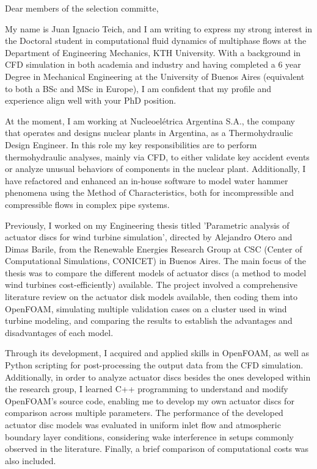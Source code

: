 \documentclass{letter}
\newcommand{\thesisname}{Parametric analysis of actuator discs for wind turbine simulation\xspace}
\newcommand{\phdtitle}{Doctoral student in computational fluid dynamics of multiphase flows\xspace}
\newcommand{\phddivision}{Department of Engineering Mechanics, KTH University\xspace}
\begin{document}
\begin{letter}{}
\opening{Dear members of the selection committe,}

My name is Juan Ignacio Teich, and I am writing to express my strong interest in the \phdtitle at the \phddivision.  
  With a background in CFD simulation in both academia and industry and having completed a 6 year Degree in Mechanical Engineering at the University of Buenos Aires (equivalent to both a BSc and MSc in Europe), I am confident that my profile and experience align well with your PhD position.

At the moment, I am working at Nucleoelétrica Argentina S.A., the company that operates and designs nuclear plants in Argentina, as a Thermohydraulic Design Engineer. In this role my key responsibilities are to perform thermohydraulic analyses, mainly via CFD, to either validate key accident events or analyze unusual behaviors of components in the nuclear plant. Additionally, I have refactored and enhanced an in-house software to model water hammer phenomena using the Method of Characteristics, both for incompressible and compressible flows in complex pipe systems. 

Previously, I worked on my Engineering thesis titled '\thesisname', directed by Alejandro Otero and Dimas Barile, from the Renewable Energies Research Group at CSC (Center of Computational Simulations, CONICET) in Buenos Aires. 
    The main focus of the thesis was to compare the different models of actuator discs (a method to model wind turbines cost-efficiently) available. 
  The project involved a comprehensive literature review on the actuator disk models available, then coding them into OpenFOAM, simulating multiple validation cases on a cluster used in wind turbine modeling, and comparing the results to establish the advantages and disadvantages of each model.  

Through its development, I acquired and applied skills in OpenFOAM, as well as Python scripting for post-processing the output data from the CFD simulation.
    Additionally, in order to analyze actuator discs besides the ones developed within the research group, I learned C++ programming to understand and modify OpenFOAM’s source code, enabling me to develop my own actuator discs for comparison across multiple parameters.
The performance of the developed actuator disc models was evaluated in uniform inlet flow and atmospheric boundary layer conditions, considering wake interference in setups commonly observed in the literature. Finally, a brief comparison of computational costs was also included.


\end{letter}
\end{document}
